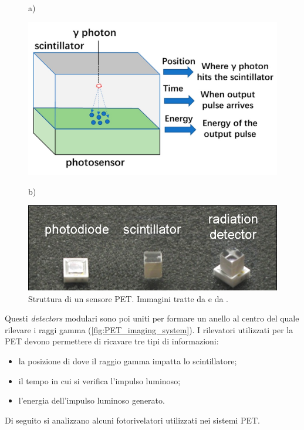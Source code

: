 \begin{figure}[tbh]
	\centering
	a)
	\begin{minipage}{.45\textwidth}
		\includegraphics[width=\linewidth]{./ImageFiles/PET_detectors.jpg}
	\end{minipage}
	b)
	\begin{minipage}{.45\textwidth}
		\includegraphics[width=\linewidth]{./ImageFiles/PET_detectors_real.jpg}
	\end{minipage}
	\caption{Struttura di un sensore PET. Immagini tratte da \cite{Jiang2019} e da \cite{Spanoudaki2010}.}
	\label{fig:photodetectors}
\end{figure}
Questi \textit{detectors} modulari sono poi uniti per formare un anello al centro del quale rilevare i raggi gamma (\Fig\ref{fig:PET_imaging_system}). I rilevatori utilizzati per la PET devono permettere di ricavare tre tipi di informazioni:
\begin{itemize}
	\item la posizione di dove il raggio gamma impatta lo scintillatore;
	\item il tempo in cui si verifica l'impulso luminoso;
	\item l'energia dell'impulso luminoso generato.
\end{itemize}
Di seguito si analizzano alcuni fotorivelatori utilizzati nei sistemi PET.

